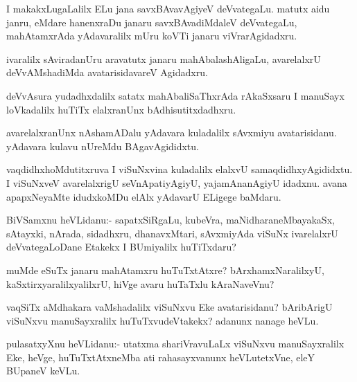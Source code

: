 \documentclass{article}
\begin{document}
\begin{mn}%
I makakxLugaLalilx ELu jana savxBAvavAgiyeV deVvategaLu. matutx aidu
janru, eMdare hanenxraDu janaru savxBAvadiMdaleV deVvategaLu,
mahAtamxrAda yAdavaralilx mUru koVTi janaru viVrarAgidadxru.
\end{mn}

\begin{mn}
ivaralilx sAviradanUru aravatutx janaru mahAbalashAligaLu, avarelalxrU
deVvAMshadiMda avatarisidavareV Agidadxru.
\end{mn}

\begin{mn}%
deVvAsura yudadhxdalilx satatx mahAbaliSaThxrAda rAkaSxsaru I manuSayx
loVkadalilx huTiTx elalxranUnx bAdhisutitxdadhxru.
\end{mn}

\begin{mn}
avarelalxranUnx nAshamADalu yAdavara kuladalilx sAvxmiyu
avatarisidanu. yAdavara kulavu nUreMdu BAgavAgididxtu.
\end{mn}

\begin{mn}
vaqdidhxhoMdutitxruva I viSuNxvina kuladalilx elalxvU
samaqdidhxyAgididxtu. I viSuNxveV avarelalxrigU seVnApatiyAgiyU,
yajamAnanAgiyU idadxnu. avana apapxNeyaMte idudxkoMDu elAlx yAdavarU
ELigege baMdaru.
\end{mn}

\begin{mn}%
BiVSamxnu heVLidanu:- sapatxSiRgaLu, kubeVra, maNidharaneMbayakaSx,
sAtayxki, nArada, sidadhxru, dhanavxMtari, sAvxmiyAda viSuNx
ivarelalxrU deVvategaLoDane Etakekx I BUmiyalilx huTiTxdaru?
\end{mn}

\begin{mn}%
muMde eSuTx janaru mahAtamxru huTuTxtAtxre? bArxhamxNaralilxyU,
kaSxtirxyaralilxyalilxrU, hiVge avaru huTaTxlu kAraNaveVnu?
\end{mn}

\begin{mn}
vaqSiTx aMdhakara vaMshadalilx viSuNxvu Eke avatarisidanu? bAribArigU
viSuNxvu manuSayxralilx huTuTxvudeVtakekx? adanunx nanage heVLu.
\end{mn}

\begin{mn}
pulasatxyXnu heVLidanu:- utatxma shariVravuLaLx viSuNxvu
manuSayxralilx Eke, heVge, huTuTxtAtxneMba ati rahasayxvanunx
heVLutetxVne, eleY BUpaneV keVLu.
\end{mn}
\end{document}
